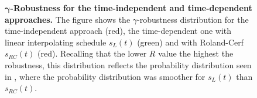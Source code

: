 
\begin{figure}[ht]
  \centering
  \caption[Robustness for the time-independent hamiltonian]{\textbf{$\bm{\gamma}$-Robustness for the time-independent and time-dependent approaches.} The figure shows the $\gamma$-robustness distribution for the time-independent approach (red), the time-dependent one with linear interpolating schedule $s_L(t)$ (green) and with Roland-Cerf $s_{RC}(t)$ (red). Recalling that the lower $R$ value the highest the robustness, this distribution reflects the probability distribution seen in , where the probability distribution was smoother for $s_L(t)$ than $s_{RC}(t)$.}
\end{figure}
